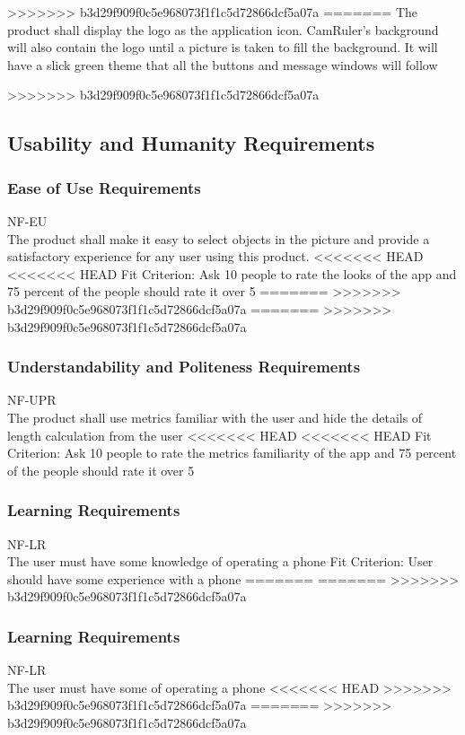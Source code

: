 \documentclass[12pt, titlepage]{article}
\begin{document}
>>>>>>> b3d29f909f0c5e968073f1f1c5d72866dcf5a07a
=======
The product shall display the logo as the application icon. CamRuler’s background will also contain the logo until a picture is taken to fill the background. It will have a slick green theme that all the buttons and message windows will follow

>>>>>>> b3d29f909f0c5e968073f1f1c5d72866dcf5a07a

\subsection{Usability and Humanity Requirements}
\subsubsection{Ease of Use Requirements}
NF-EU\\
The product shall make it easy to select objects in the picture and provide a satisfactory experience for any user using this product.
<<<<<<< HEAD
<<<<<<< HEAD
{\color{red}Fit Criterion: Ask 10 people to rate the looks of the app and  75 percent of the people should rate it over 5 }
=======
>>>>>>> b3d29f909f0c5e968073f1f1c5d72866dcf5a07a
=======
>>>>>>> b3d29f909f0c5e968073f1f1c5d72866dcf5a07a

\subsubsection{Understandability and Politeness Requirements}
NF-UPR\\
The product shall use metrics familiar with the user and hide the details of length calculation from the user 
<<<<<<< HEAD
<<<<<<< HEAD
{\color{red}Fit Criterion: Ask 10 people to rate the metrics familiarity of the app and  75 percent of the people should rate it over 5 }

\subsubsection{Learning Requirements}
NF-LR \\
The user must have some knowledge of operating a phone 
{\color{red}Fit Criterion: User should have some experience with a phone}
=======
=======
>>>>>>> b3d29f909f0c5e968073f1f1c5d72866dcf5a07a

\subsubsection{Learning Requirements}
NF-LR \\
The user must have some of operating a phone 
<<<<<<< HEAD
>>>>>>> b3d29f909f0c5e968073f1f1c5d72866dcf5a07a
=======
>>>>>>> b3d29f909f0c5e968073f1f1c5d72866dcf5a07a
\end{document}

